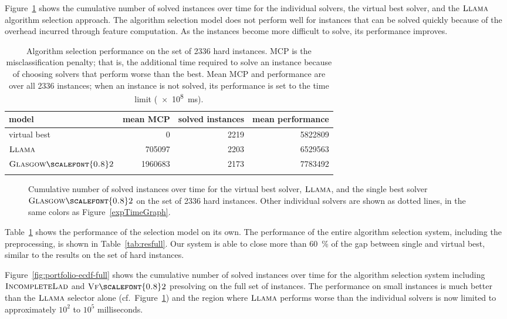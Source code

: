 \documentclass{llncs}
\newcommand{\VFtwo}{$\textsc{Vf{\scalefont{0.8}2}}$\xspace}
\newcommand{\IncompleteLAD}{$\textsc{IncompleteLad}$\xspace}
\newcommand{\GlasgowTwo}{$\textsc{Glasgow{\scalefont{0.8}2}}$\xspace}
\newcommand{\LLAMA}{$\textsc{Llama}$\xspace}
\begin{document}
Figure~\ref{fig:portfolio-ecdf} shows the cumulative number of solved instances over time
for the individual solvers, the virtual best solver, and the \LLAMA algorithm
selection approach. The algorithm selection model does not perform well for
instances that can be solved quickly because of the overhead incurred through
feature computation.  As the instances become more difficult to solve, its
performance improves.

\begin{table}[p]
    \centering\setlength{\tabcolsep}{1em}
\begin{tabular}{lrrr}
  \toprule
model & mean MCP & solved instances & mean performance\\
  \midrule
virtual best & 0 & 2219 & 5822809\\
\LLAMA & 705097 & 2203 & 6529563\\
\GlasgowTwo & 1960683 & 2173 & 7783492\\
   \bottomrule \\
\end{tabular}
\caption{Algorithm selection performance on the set of 2336 hard instances. MCP is the
misclassification penalty; that is, the additional time required to solve an instance because of
choosing solvers that perform worse than the best. Mean MCP and performance are over all 2336 instances; when an
instance is not solved, its performance is set to the time limit
(\SI{e8}{\ms}).}\label{tab:res}
\end{table}

\begin{figure}[p]


\caption{Cumulative number of solved instances over time for the virtual best solver,
\LLAMA, and the single best solver \GlasgowTwo on the set of 2336 hard
instances. Other individual solvers are shown as dotted lines, in the same
colors as Figure~\ref{expTimeGraph}. }
\label{fig:portfolio-ecdf}
\end{figure}

Table~\ref{tab:res} shows the performance of the selection model on its own. The
performance of the entire algorithm selection system, including the
preprocessing, is shown in Table~\ref{tab:resfull}. Our system is able to close
more than \SI{60}{\percent} of the gap between single and virtual best, similar
to the results on the set of hard instances.

Figure~\ref{fig:portfolio-ecdf-full} shows the cumulative number of solved instances over
time for the algorithm selection system including \IncompleteLAD and \VFtwo
presolving on the full set of instances. The performance on small instances is
much better than the \LLAMA selector alone (cf.\
Figure~\ref{fig:portfolio-ecdf}) and the region where \LLAMA performs worse than
the individual solvers is now limited to approximately $10^2$ to $10^5$
milliseconds.
\end{document}
